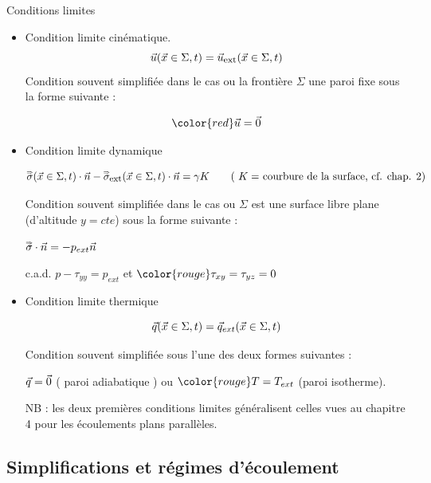 \begin{frame}{Conditions limites}
\small

\begin{itemize}
\item Condition limite cinématique.
$$
\vec{u}(\vec{x} \in \Sigma, t) = \vec{u}_{\mbox{\footnotesize ext}}(\vec{x} \in \Sigma, t)
$$
Condition souvent simplifiée dans le cas ou la frontière $\Sigma$ une paroi fixe sous la forme suivante :

$$\color{red} \myvec{u} = \myvec{0}$$

\pause

\item Condition limite dynamique 

$$
\accentset{\Rightarrow}{\sigma}(\vec{x} \in \Sigma, t) \cdot \vec{n} 
	-
	\accentset{\Rightarrow}{\sigma}_{\mbox{\footnotesize ext}}(\vec{x} \in \Sigma, t)\cdot \vec{n}
= \gamma K \qquad \mbox{( $K = $ courbure de la surface, cf. chap. 2)}
$$


Condition souvent simplifiée dans le cas ou $\Sigma$ est une surface libre plane (d'altitude $y=cte$) sous la forme suivante :

$\accentset{\Rightarrow}{\sigma} \cdot \vec{n}  =-  p_{ext} \vec{n} $ 

c.a.d. { \color{rouge} $ p - \tau_{yy} = p_{ext}$}  et ${\color{rouge}  \tau_{xy} = \tau_{yz} = 0 }$

\pause

\item Condition limite thermique

$$ \vec{q}(\vec{x} \in \Sigma, t)  = \vec{q}_{ext}(\vec{x} \in \Sigma, t)  $$ 

Condition souvent simplifiée sous l'une des deux formes suivantes :

 { \color{rouge} $ \vec{q} = \vec{0} $}  ( paroi adiabatique ) ou ${\color{rouge}  T = T_{ext}}$ (paroi isotherme).

\pause
\medskip

NB : les deux premières conditions limites généralisent celles vues au chapitre 4 pour les écoulements plans parallèles.

\end{itemize}





\end{frame}


\subsection{Simplifications et régimes d'écoulement}

